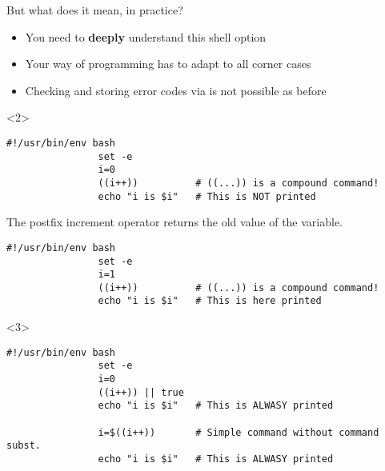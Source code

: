 \begin{frame}[fragile]{But what does it mean, in practice?}
    \vspace{-4mm}
    \begin{overlayarea}{\textwidth}{0.7\textheight}
        \begin{itemize}
            \setlength{\itemsep}{0pt}
            \item \alert<2>{You need to \textbf{deeply} understand this shell option}
            \item \alert<3-4>{Your way of programming has to adapt to all corner cases}
            \item \alert<5>{Checking and storing error codes via  is not possible as before}
        \end{itemize}
        \vspace{2mm}
        \begin{onlyenv}<2>
            \begin{lstlisting}[style=myBash]
                #!/usr/bin/env bash
                set -e
                i=0
                ((i++))          # ((...)) is a compound command!
                echo "i is $i"   # This is NOT printed
            \end{lstlisting}
            \centerline{\tiny The postfix increment operator returns the old value of the variable.}
            \begin{lstlisting}[style=myBash, aboveskip=2mm]
                #!/usr/bin/env bash
                set -e
                i=1
                ((i++))          # ((...)) is a compound command!
                echo "i is $i"   # This is here printed
            \end{lstlisting}
        \end{onlyenv}
        \begin{onlyenv}<3>
            \begin{lstlisting}[style=myBash]
                #!/usr/bin/env bash
                set -e
                i=0
                ((i++)) || true
                echo "i is $i"   # This is ALWASY printed

                i=$((i++))       # Simple command without command subst.
                echo "i is $i"   # This is ALWASY printed


\end{lstlisting}
\end{onlyenv}
\end{overlayarea}
\end{frame}
